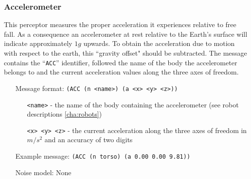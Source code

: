 


\subsubsection{Accelerometer}
\label{sec:ACC}
This perceptor measures the proper acceleration it experiences
relative to free fall. As a consequence an accelerometer at rest
relative to the Earth's surface will indicate approximately $1 g$
upwards. To obtain the acceleration due to motion with respect to the
earth, this ``gravity offset" should be subtracted. The message contains the
``\texttt{ACC}'' identifier, followed the name of the body the accelerometer
belongs to and the current acceleration values along the three axes of freedom.
\begin{itemize}
	\item[Message format:] \texttt{(ACC (n <name>) (a <x> <y> <z>))}
		\begin{itemize}
		  \item[\texttt{<name>} -] the name of the body containing the
		  accelerometer (see robot descriptions \ref{cha:robots})
		  \item[\texttt{<x> <y> <z>} -] the current acceleration along the
		  three axes of freedom in $m/s^{2}$ and an accuracy of two digits
		\end{itemize}
	\item[Example message:] \texttt{(ACC (n torso) (a 0.00 0.00 9.81))}
	\item[Noise model:] None
\end{itemize}



